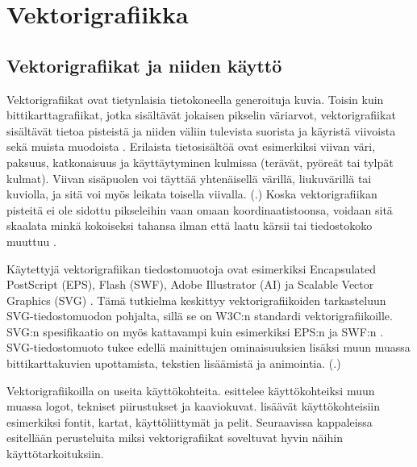 \documentclass[utf8,bachelor]{gradu3}
\newcommand{\parencitedot}[1]{(\cite{#1}.)}
\begin{document}
\chapter{Vektorigrafiikka}

\section{Vektorigrafiikat ja niiden käyttö}\label{määrittely}


Vektorigrafiikat ovat tietynlaisia tietokoneella generoituja kuvia. Toisin kuin bittikarttagrafiikat, jotka sisältävät jokaisen pikselin väriarvot, vektorigrafiikat sisältävät tietoa pisteistä ja niiden väliin tulevista suorista ja käyristä viivoista sekä muista muodoista \parencites{RefWorks:doc:5bdc5224e4b05afcfde5b159}{RefWorks:doc:5bdc5292e4b05afcfde5b171}. Erilaista tietosisältöä ovat esimerkiksi viivan väri, paksuus, katkonaisuus ja käyttäytyminen kulmissa (terävät, pyöreät tai tylpät kulmat). Viivan sisäpuolen voi täyttää yhtenäisellä värillä, liukuvärillä tai kuviolla, ja sitä voi myös leikata toisella viivalla. \parencitedot{RefWorks:doc:5bd74719e4b0e42e08f6333b} Koska vektorigrafiikan pisteitä ei ole sidottu pikseleihin vaan omaan koordinaatistoonsa, voidaan sitä skaalata minkä kokoiseksi tahansa ilman että laatu kärsii tai tiedostokoko muuttuu \parencite{RefWorks:doc:5bdc5292e4b05afcfde5b171}.

Käytettyjä vektorigrafiikan tiedostomuotoja ovat esimerkiksi Encapsulated PostScript (EPS), Flash (SWF), Adobe Illustrator (AI) ja Scalable Vector Graphics (SVG) \parencite{RefWorks:doc:5bdc5224e4b05afcfde5b159}. Tämä tutkielma keskittyy vektorigrafiikoiden tarkasteluun SVG-tiedostomuodon pohjalta, sillä se on W3C:n standardi vektorigrafiikoille. SVG:n spesifikaatio on myös kattavampi kuin esimerkiksi EPS:n \parencite{RefWorks:doc:5bdc900de4b0afdabde32fb7} ja SWF:n \parencite{RefWorks:doc:5bdc9306e4b069b454d8459e}. SVG-tiedostomuoto tukee edellä mainittujen ominaisuuksien lisäksi muun muassa bittikarttakuvien upottamista, tekstien lisäämistä ja animointia. \parencitedot{RefWorks:doc:5bd74719e4b0e42e08f6333b}

Vektorigrafiikoilla on useita käyttökohteita. \textcite{RefWorks:doc:5bdc5224e4b05afcfde5b159} esittelee käyttökohteiksi muun muassa logot, tekniset piirustukset ja kaaviokuvat. \textcite{RefWorks:doc:5bdd9b5ae4b0954dddb26329} lisäävät käyttökohteisiin esimerkiksi fontit, kartat, käyttöliittymät ja pelit. Seuraavissa kappaleissa esitellään perusteluita miksi vektorigrafiikat soveltuvat hyvin näihin käyttötarkoituksiin.
\end{document}
